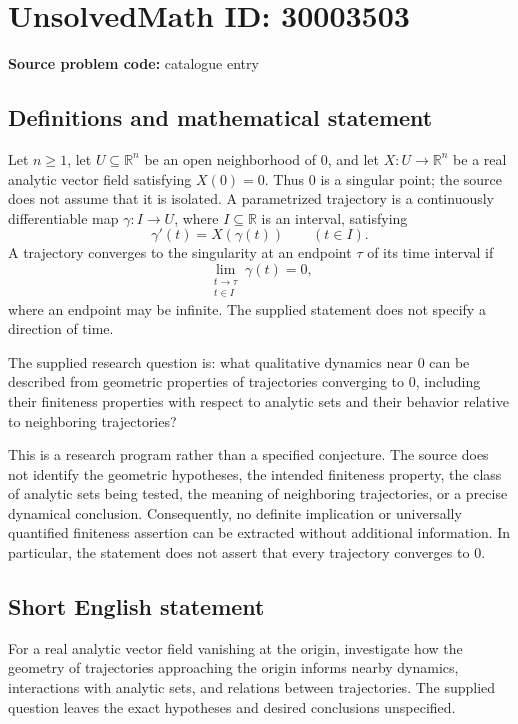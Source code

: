 \documentclass[11pt]{article}
\newcommand{\R}{\mathbb{R}}
\begin{document}
\section*{UnsolvedMath ID: 30003503}
\textbf{Source problem code:} catalogue entry
\subsection{Definitions and mathematical statement}
Let \(n\geq 1\), let \(U\subseteq\R^n\) be an open neighborhood of \(0\), and let \(X:U\to\R^n\) be a real analytic vector field satisfying \(X(0)=0\). Thus \(0\) is a singular point; the source does not assume that it is isolated. A parametrized trajectory is a continuously differentiable map \(\gamma:I\to U\), where \(I\subseteq\R\) is an interval, satisfying
\[
\gamma'(t)=X(\gamma(t))\qquad(t\in I).
\]
A trajectory converges to the singularity at an endpoint \(\tau\) of its time interval if
\[
\lim_{\substack{t\to\tau\\t\in I}}\gamma(t)=0,
\]
where an endpoint may be infinite. The supplied statement does not specify a direction of time.

The supplied research question is: what qualitative dynamics near \(0\) can be described from geometric properties of trajectories converging to \(0\), including their finiteness properties with respect to analytic sets and their behavior relative to neighboring trajectories?

This is a research program rather than a specified conjecture. The source does not identify the geometric hypotheses, the intended finiteness property, the class of analytic sets being tested, the meaning of neighboring trajectories, or a precise dynamical conclusion. Consequently, no definite implication or universally quantified finiteness assertion can be extracted without additional information. In particular, the statement does not assert that every trajectory converges to \(0\).
\subsection{Short English statement}
For a real analytic vector field vanishing at the origin, investigate how the geometry of trajectories approaching the origin informs nearby dynamics, interactions with analytic sets, and relations between trajectories. The supplied question leaves the exact hypotheses and desired conclusions unspecified.
\end{document}
